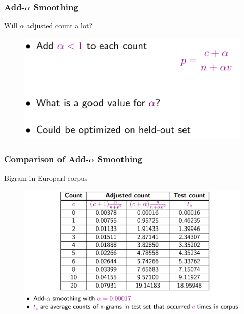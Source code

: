 \documentclass{beamer}
\begin{document}
\begin{frame}\frametitle{Add-$\alpha$ Smoothing}

\begin{block}{Will $\alpha$ adjusted count a lot?}
\begin{figure}
\includegraphics[width=0.8\linewidth]{figure/add_alpha_smoothing.pdf}
\label{fig:add_alpha_smoothing}
\end{figure}
\end{block}

\end{frame}


\begin{frame}\frametitle{Comparison of Add-$\alpha$ Smoothing}

\begin{block}{Bigram in Europarl corpus}

\begin{figure}
\includegraphics[width=0.9\linewidth]{figure/bigram_alpha_smoothing.pdf}
\label{fig:bigram_alpha_smoothing}
\end{figure}

\end{block}
\end{frame}
\end{document}
